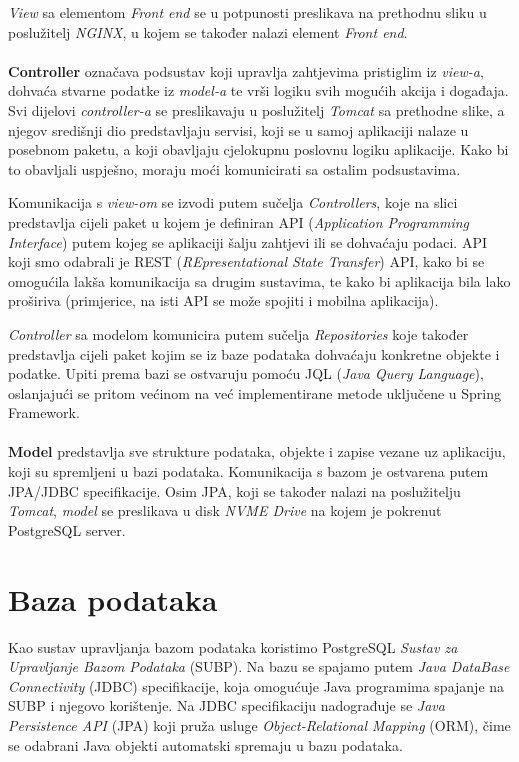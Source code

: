 		\textit{View} sa elementom \textit{Front end} se u potpunosti preslikava na prethodnu sliku u poslužitelj \textit{NGINX}, u kojem se također nalazi element \textit{Front end}.\\
		\\
		\textbf{Controller} označava podsustav koji upravlja zahtjevima pristiglim iz \textit{view-a}, dohvaća stvarne podatke iz \textit{model-a} te vrši logiku svih mogućih akcija i događaja. Svi dijelovi \textit{controller-a} se preslikavaju u poslužitelj \textit{Tomcat} sa prethodne slike, a njegov središnji dio predstavljaju servisi, koji se u samoj aplikaciji nalaze u posebnom paketu, a koji obavljaju cjelokupnu poslovnu logiku aplikacije. Kako bi to obavljali uspješno, moraju moći komunicirati sa ostalim podsustavima.
		
		Komunikacija s \textit{view-om} se izvodi putem sučelja \textit{Controllers}, koje na slici predstavlja cijeli paket u kojem je definiran API (\textit{Application Programming Interface}) putem kojeg se aplikaciji šalju zahtjevi ili se dohvaćaju podaci. API koji smo odabrali je REST (\textit{REpresentational State Transfer}) API, kako bi se omogućila lakša komunikacija sa drugim sustavima, te kako bi aplikacija bila lako proširiva (primjerice, na isti API se može spojiti i mobilna aplikacija).
		 
		\textit{Controller} sa modelom komunicira putem sučelja \textit{Repositories} koje također predstavlja cijeli paket kojim se iz baze podataka dohvaćaju konkretne objekte i podatke. Upiti prema bazi se ostvaruju pomoću JQL (\textit{Java Query Language}), oslanjajući se pritom većinom na već implementirane metode uključene u Spring Framework.\\
		\\
		\textbf{Model} predstavlja sve strukture podataka, objekte i zapise vezane uz aplikaciju, koji su spremljeni u bazi podataka. Komunikacija s bazom je ostvarena putem JPA/JDBC specifikacije. Osim JPA, koji se također nalazi na poslužitelju \textit{Tomcat}, \textit{model} se preslikava u disk \textit{NVME Drive} na kojem je pokrenut PostgreSQL server. 

	
		\section{Baza podataka}
			
			Kao sustav upravljanja bazom podataka koristimo PostgreSQL \textit{Sustav za Upravljanje Bazom Podataka} (SUBP). Na bazu se spajamo putem \textit{Java DataBase Connectivity} (JDBC) specifikacije, koja omogućuje Java programima spajanje na SUBP i njegovo korištenje. Na JDBC specifikaciju nadograđuje se \textit{Java Persistence API} (JPA) koji pruža usluge \textit{Object-Relational Mapping} (ORM), čime se odabrani Java objekti automatski spremaju u bazu podataka.
		
